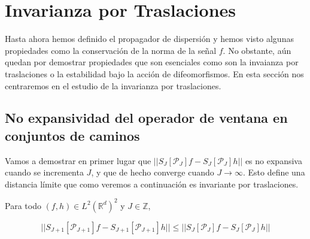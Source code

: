

\chapter{Invarianza por Traslaciones} \label{ch:seccion14}

\noindent Hasta ahora hemos definido el propagador de dispersión y hemos visto algunas propiedades como la conservación de la norma de la señal $f$. No obstante, aún quedan por demostrar propiedades que son esenciales como son la invaianza por traslaciones o la estabilidad bajo la acción de difeomorfismos. En esta sección nos centraremos en el estudio de la invarianza por traslaciones.

\section{No expansividad del operador de ventana en conjuntos de caminos}
Vamos a demostrar en primer lugar que $||S_J[\mathcal{P}_J] f- S_J[\mathcal{P}_J] h ||$ es no expansiva cuando se incrementa $J$, y que de hecho converge cuando $J \rightarrow \infty$. Esto define una distancia límite que como veremos a continuación es invariante por traslaciones.

\medskip

\begin{proposicion}
\noindent Para todo $(f,h) \in L^2(\mathbb{R}^d)^2$ y $J\in \mathbb{Z}$, 

\begin{equation} \label{eq::1.10}
  || S_{J+1} [\mathcal{P}_{J+1}]f- S_{J+1}[\mathcal{P}_{J+1}]h || \leq ||S_J[\mathcal{P}_J]f - S_J[\mathcal{P}_J]h || 
\end{equation}

\end{proposicion}

